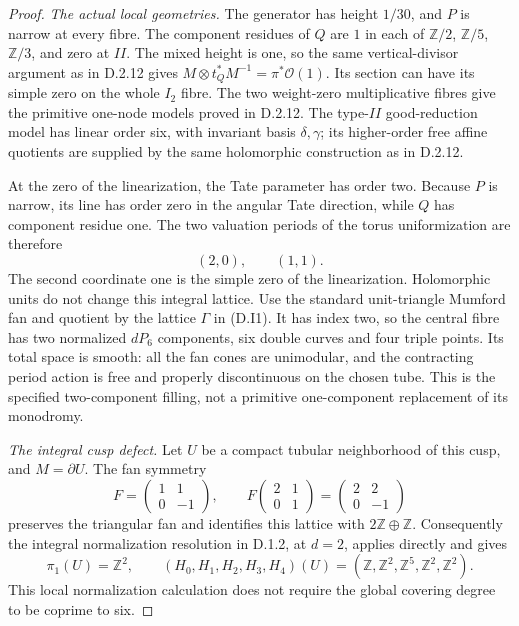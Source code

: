 \begin{proof}
\emph{The actual local geometries.}
The generator has height $1/30$, and $P$ is narrow at
every fibre. The component residues of $Q$ are $1$ in
each of $\mathbb Z/2$, $\mathbb Z/5$, $\mathbb Z/3$,
and zero at $II$. The mixed height is one, so the same
vertical-divisor argument as in D.2.12 gives
$M\otimes t_Q^*M^{-1}=\pi^*\mathcal O(1)$.
Its section can have its simple zero on the whole $I_2$
fibre. The two weight-zero multiplicative fibres give
the primitive one-node models proved in D.2.12.
The type-$II$ good-reduction model has linear order six,
with invariant basis $\delta,\gamma$; its higher-order
free affine quotients are supplied by the same holomorphic
construction as in D.2.12.

At the zero of the linearization, the Tate parameter has
order two. Because $P$ is narrow, its line has order zero
in the angular Tate direction, while $Q$ has component
residue one. The two valuation periods of the torus
uniformization are therefore
\[
                 (2,0),\qquad(1,1).
 \tag{D.I1}
\]
The second coordinate one is the simple zero of the
linearization. Holomorphic units do not change this
integral lattice. Use the standard unit-triangle Mumford
fan and quotient by the lattice $\Gamma$ in (D.I1).
It has index two, so the central fibre has two normalized
$dP_6$ components, six double curves and four triple
points. Its total space is smooth: all the fan cones are
unimodular, and the contracting period action is free
and properly discontinuous on the chosen tube.
This is the specified two-component filling, not a
primitive one-component replacement of its monodromy.

\emph{The integral cusp defect.}
Let $U$ be a compact tubular neighborhood of this cusp,
and $M=\partial U$. The fan symmetry
\[
 F=\begin{pmatrix}1&1\\0&-1\end{pmatrix},\qquad
 F\begin{pmatrix}2&1\\0&1\end{pmatrix}
     =\begin{pmatrix}2&2\\0&-1\end{pmatrix}
\]
preserves the triangular fan and identifies this lattice
with $2\mathbb Z\oplus\mathbb Z$.
Consequently the integral normalization resolution in
D.1.2, at $d=2$, applies directly and gives
\[
 \pi_1(U)=\mathbb Z^2,\qquad
 (H_0,H_1,H_2,H_3,H_4)(U)
   =(\mathbb Z,\mathbb Z^2,\mathbb Z^5,\mathbb Z^2,\mathbb Z^2).
 \tag{D.I2}
\]
This local normalization calculation does not require the
global covering degree to be coprime to six.


\end{proof}
